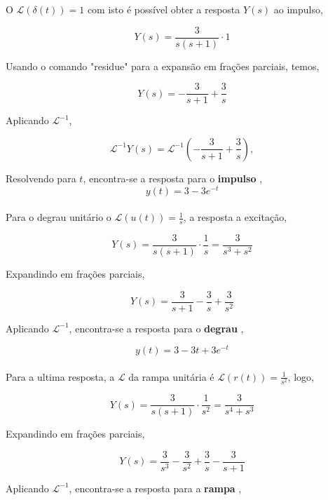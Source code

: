 \documentclass[paper=a4, fontsize=11pt]{article}
\begin{document}
\begin{list}{\textbf{Questão .}}{
\setlength{\labelwidth}{-2mm} \setlength{\parsep}{0mm}
\setlength{\topsep}{0mm} \setlength{\leftmargin}{0mm}}
\begin{enumerate}
            O $\mathcal{L}(\delta(t)) = 1$ com isto é possível obter a resposta 
            $Y(s)$ ao impulso, 
    
            $$
                Y(s) = \frac{3}{s(s+1)} \cdot 1
            $$

            Usando o comando "residue" para a expansão em frações parciais, temos,

            $$
                Y(s) = -\frac{3}{s+1} + \frac{3}{s}
            $$

            Aplicando $\mathcal{L}^{-1}$,

            $$
            \mathcal{L}^{-1}Y(s)=\mathcal{L}^{-1}( -\frac{3}{s+1} + \frac{3}{s} ),
            $$

            Resolvendo para $t$, encontra-se a resposta para o \textbf{impulso} ,
            \begin{equation}
                y(t) = 3 - 3 e^{-t}
            \end{equation}\\

            

            Para o degrau unitário o $\mathcal{L}(u(t)) = \frac{1}{s}$, a resposta a excitação,

            $$
            Y(s) = \frac{3}{s(s+1)} \cdot \frac{1}{s} = \frac{3}{s^3+s^2}
            $$

            Expandindo em frações parciais,

            $$
            Y(s) = \frac{3}{s+1} - \frac{3}{s} + \frac{3}{s^2} 
            $$

            Aplicando $\mathcal{L}^{-1}$, encontra-se a resposta para o \textbf{degrau} ,

            \begin{equation}
            y(t) = 3 - 3 t + 3 e^{-t}
            \end{equation}\\


            Para a ultima resposta, a $\mathcal{L}$ da rampa unitária é $\mathcal{L}(r(t)) = \frac{1}{s^2}$, logo,

            $$
            Y(s) = \frac{3}{s(s+1)} \cdot \frac{1}{s^2} = \frac{3}{s^4 + s^3}
            $$

            Expandindo em frações parciais,

            $$
            Y(s) = \frac{3}{s^3} - \frac{3}{s^2} + \frac{3}{s} - \frac{3}{s+1}
            $$

            Aplicando $\mathcal{L}^{-1}$, encontra-se a resposta para a \textbf{rampa} ,


\end{enumerate}
\end{list}
\end{document}
